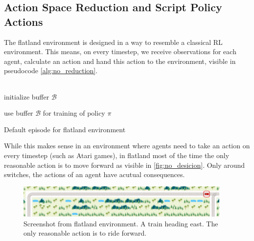 \subsection*{Action Space Reduction and Script Policy Actions}\label{reduced_action_space}
The flatland environment is designed in a way to resemble a classical RL environment. This means, on every timestep, we receive observations for each agent, calculate an action and hand this action to the environment, visible in pseudocode \autoref{alg:no_reduction}.\\\\
\begin{algorithm}[H]
	initialize buffer $\mathcal{B}$\\

	use buffer $\mathcal{B}$ for training of policy $\pi$
	\caption{Default episode for flatland environment}
	\label{alg:no_reduction}
\end{algorithm}
While this makes sense in an environment where agents need to take an action on every timestep (such as Atari games), in flatland most of the time the only reasonable action is to move forward as visible in \autoref{fig:no_desicion}. Only around switches, the actions of an agent have acutual consequences.
\begin{figure}[H]
	\centering
	\includegraphics[width=300pt]{images/screenshot_no_decision.png}
	\caption{Screenshot from flatland environment. A train heading east. The only reasonable action is to ride forward.}
	\label{fig:no_desicion}
\end{figure}

